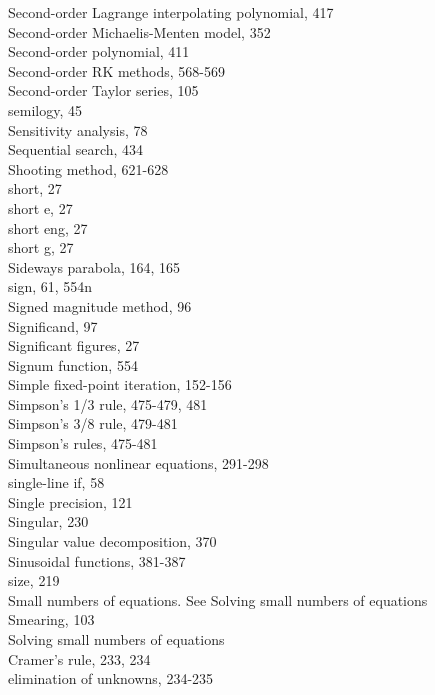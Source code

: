 \documentclass[../main.tex]{subfiles}
\begin{document}
\begin{multicols}{3}
    Second-order Lagrange interpolating polynomial, 417\\
    Second-order Michaelis-Menten model, 352\\
    Second-order polynomial, 411\\
    Second-order RK methods, 568-569\\
    Second-order Taylor series, 105\\
    semilogy, 45\\
    Sensitivity analysis, 78\\
    Sequential search, 434\\
    Shooting method, 621-628\\
    short, 27\\
    short e, 27\\
    short eng, 27\\
    short g, 27\\
    Sideways parabola, 164, 165\\
    sign, 61, 554n\\
    Signed magnitude method, 96\\
    Significand, 97\\
    Significant figures, 27\\
    Signum function, 554\\
    Simple fixed-point iteration, 152-156\\
    Simpson's 1/3 rule, 475-479, 481\\
    Simpson's 3/8 rule, 479-481\\
    Simpson's rules, 475-481\\
    Simultaneous nonlinear equations, 291-298\\
    single-line if, 58\\
    Single precision, 121\\
    Singular, 230\\
    Singular value decomposition, 370\\
    Sinusoidal functions, 381-387\\
    size, 219\\
    Small numbers of equations. See Solving small numbers of equations\\
    Smearing, 103\\
    Solving small numbers of equations\\
    \hspace*{3mm}Cramer's rule, 233, 234\\
    \hspace*{3mm}elimination of unknowns, 234-235\\

\end{multicols}
\end{document}
